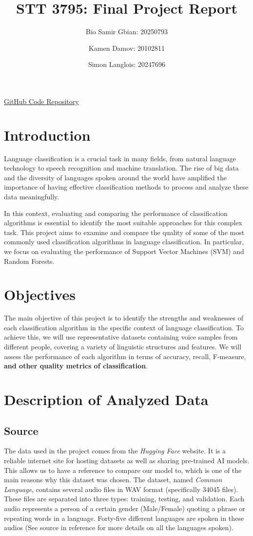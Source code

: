 \documentclass[twocolumn]{article}
\title{STT 3795: Final Project Report}
\author{Bio Samir Gbian: 20250793}
\author{Kamen Damov: 20102811}
\author{Simon Langlois: 20247696}
\affil{Department of Mathematics and Statistics}
\affil{University of Montreal}
\begin{document}
\maketitle

\href{https://github.com/Gonxped31/Projet-STT-3795}{GitHub Code Repository}

\section{Introduction}
Language classification is a crucial task in many fields, from natural language technology to speech recognition and machine translation. The rise of big data and the diversity of languages spoken around the world have amplified the importance of having effective classification methods to process and analyze these data meaningfully.

In this context, evaluating and comparing the performance of classification algorithms is essential to identify the most suitable approaches for this complex task. This project aims to examine and compare the quality of some of the most commonly used classification algorithms in language classification. In particular, we focus on evaluating the performance of Support Vector Machines (SVM) and Random Forests.

\section{Objectives}
The main objective of this project is to identify the strengths and weaknesses of each classification algorithm in the specific context of language classification. To achieve this, we will use representative datasets containing voice samples from different people, covering a variety of linguistic structures and features. We will assess the performance of each algorithm in terms of accuracy, recall, F-measure, \textbf{and other quality metrics of classification}.

\section{Description of Analyzed Data}
\subsection{Source}
The data used in the project comes from the \textit{Hugging Face} website. It is a reliable internet site for hosting datasets as well as sharing pre-trained AI models. This allows us to have a reference to compare our model to, which is one of the main reasons why this dataset was chosen.
The dataset, named \textit{Common Language}, contains several audio files in WAV format (specifically 34045 files). These files are separated into three types: training, testing, and validation. Each audio represents a person of a certain gender (Male/Female) quoting a phrase or repeating words in a language. Forty-five different languages are spoken in these audios (See source in reference for more details on all the languages spoken).
\end{document}
